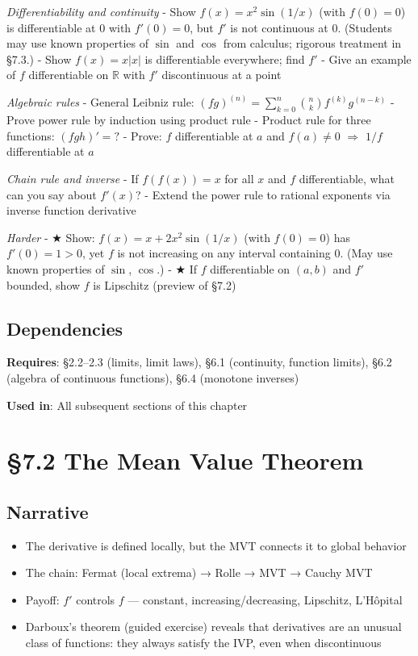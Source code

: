 \documentclass[
  10pt,
  letterpaper,
]{scrbook}
\providecommand{\tightlist}{%
  \setlength{\itemsep}{0pt}\setlength{\parskip}{0pt}}
\newcommand{\RR}{\mathbb{R}}
\begin{document}
\emph{Differentiability and continuity} - Show \(f(x) = x^2 \sin(1/x)\)
(with \(f(0) = 0\)) is differentiable at \(0\) with \(f'(0) = 0\), but
\(f'\) is not continuous at \(0\). (Students may use known properties of
\(\sin\) and \(\cos\) from calculus; rigorous treatment in §7.3.) - Show
\(f(x) = x|x|\) is differentiable everywhere; find \(f'\) - Give an
example of \(f\) differentiable on \(\RR\) with \(f'\) discontinuous at
a point

\emph{Algebraic rules} - General Leibniz rule:
\((fg)^{(n)} = \sum_{k=0}^{n} \binom{n}{k} f^{(k)} g^{(n-k)}\) - Prove
power rule by induction using product rule - Product rule for three
functions: \((fgh)' = ?\) - Prove: \(f\) differentiable at \(a\) and
\(f(a) \neq 0\) \(\Longrightarrow\) \(1/f\) differentiable at \(a\)

\emph{Chain rule and inverse} - If \(f(f(x)) = x\) for all \(x\) and
\(f\) differentiable, what can you say about \(f'(x)\)? - Extend the
power rule to rational exponents via inverse function derivative

\emph{Harder} - ★ Show: \(f(x) = x + 2x^2 \sin(1/x)\) (with
\(f(0) = 0\)) has \(f'(0) = 1 > 0\), yet \(f\) is not increasing on any
interval containing \(0\). (May use known properties of \(\sin\),
\(\cos\).) - ★ If \(f\) differentiable on \((a,b)\) and \(f'\) bounded,
show \(f\) is Lipschitz (preview of §7.2)

\subsection{Dependencies}\label{dependencies-29}

\textbf{Requires}: §2.2--2.3 (limits, limit laws), §6.1 (continuity,
function limits), §6.2 (algebra of continuous functions), §6.4 (monotone
inverses)

\textbf{Used in}: All subsequent sections of this chapter

\section{§7.2 The Mean Value Theorem}\label{the-mean-value-theorem}

\subsection{Narrative}\label{narrative-30}

\begin{itemize}
\tightlist
\item
  The derivative is defined locally, but the MVT connects it to global
  behavior
\item
  The chain: Fermat (local extrema) → Rolle → MVT → Cauchy MVT
\item
  Payoff: \(f'\) controls \(f\) --- constant, increasing/decreasing,
  Lipschitz, L'Hôpital
\item
  Darboux's theorem (guided exercise) reveals that derivatives are an
  unusual class of functions: they always satisfy the IVP, even when
  discontinuous
\end{itemize}
\end{document}
